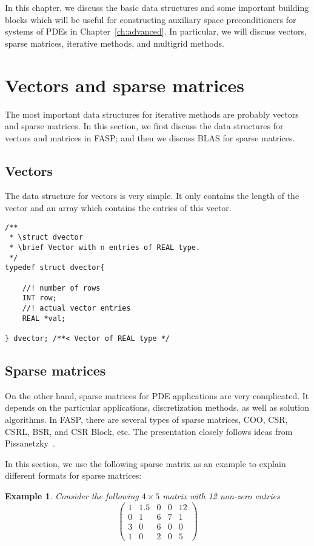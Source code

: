 \documentclass[11pt]{memoir}
\newtheorem{example}[theorem]{Example}
\begin{document}
In this chapter, we discuss the basic data structures and some important building blocks which will be useful for constructing auxiliary space preconditioners for systems of PDEs in Chapter~\ref{ch:advanced}. In particular, we will discuss vectors, sparse matrices, iterative methods, and multigrid methods. 

\section{Vectors and sparse matrices}\label{sec:blas}

The most important data structures for iterative methods are probably vectors and sparse matrices. In this section, we first discuss the data structures for vectors and matrices in FASP; and then we discuss BLAS for sparse matrices. 

\subsection{Vectors}

The data structure for vectors is very simple. It only contains the length of the vector and an array which contains the entries of this vector. 

\begin{lstlisting}
/** 
 * \struct dvector
 * \brief Vector with n entries of REAL type.
 */
typedef struct dvector{
	
    //! number of rows
	INT row;
    //! actual vector entries
	REAL *val;
	
} dvector; /**< Vector of REAL type */
\end{lstlisting}

\subsection{Sparse matrices}

On the other hand, sparse matrices for PDE applications are very complicated. It depends on the particular applications, discretization methods, as well as solution algorithms. In FASP, there are several types of sparse matrices, COO, CSR, CSRL, BSR, and CSR Block, etc. The presentation closely follows ideas from Pissanetzky~\cite{Pissanetzky.Pissanetzky.1984hc}. 

In this section, we use the following sparse matrix as an example to explain different formats for sparse matrices:
%
\begin{example}\label{ex:sparse}
Consider the following $4\times 5$ matrix with 12 non-zero entries
$$ 
\left(\begin{array}{ccccc}
1 & 1.5 & 0 & 0 & 12\\
0 & 1    & 6 & 7 & 1\\
3 & 0    & 6 & 0 & 0\\
1 & 0    & 2 & 0 & 5
\end{array}
\right)
$$
\end{example}
\end{document}
